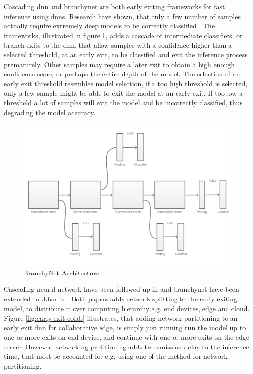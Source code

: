 Cascading \gls{dnn} \cite{leroux_resource-constrained_2015} and \gls{branchynet} \cite{teerapittayanon_branchynet:_2016} are both early exiting frameworks for fast inference using \gls{dnn}s. Research have shown, that only a few number of samples actually require extremely deep models to be correctly classified \cite{bibid}. The frameworks, illustrated in figure \ref{fig:branchynet}, adds a cascade of intermediate classifiers, or branch exits to the \gls{dnn}, that allow samples with a confidence higher than a selected threshold, at an early exit, to be classified and exit the inference process prematurely. Other samples may require a later exit to obtain a high enough confidence score, or perhaps the entire depth of the model. The selection of an early exit threshold resembles model selection, if a too high threshold is selected, only a few sample might be able to exit the model at an early exit. If too low a threshold a lot of samples will exit the model and be incorrectly classified, thus degrading the model accuracy. 

\begin{figure}
	\centering
	\includegraphics[width=\linewidth]{figures/models/branchy}
	\caption[BranchyNet Architecture]{BranchyNet Architecture}
	\label{fig:branchynet}
\end{figure}

Cascading neural network \cite{leroux_resource-constrained_2015} have been followed up in \cite{leroux_cascading_2017} and \gls{branchynet} have been extended to \gls{ddnn} in \cite{teerapittayanon_distributed_2017}. Both papers adds network splitting to the early exiting model, to distribute it over computing hierarchy e.g. end devices, edge and cloud. Figure \ref{fig:early-exit-colab} illustrates, that adding network partitioning to an early exit \gls{dnn} for collaborative edge, is simply just running run the model up to one or more exits on end-device, and continue with one or more exits on the edge server. However, networking partitioning adds transmission delay to the inference time, that most be accounted for e.g. using one of the method for network partitioning.

